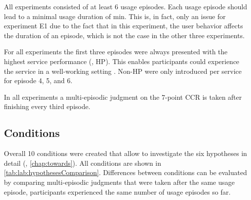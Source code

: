 All experiments consisted of at least 6 usage episodes.
Each usage episode should lead to a minimal usage duration of \unit[2]{min}.
This is, in fact, only an issue for experiment E1 due to the fact that in this experiment, the user behavior affects the duration of an episode, which is not the case in the other three experiments.

For all experiments the first three episodes were always presented with the highest service performance (\ie, \acf{HP}).
This enables participants could experience the service in a well-working setting \citep[\cf,][]{moller_single-call_2011}.
Non-\ac{HP} were only introduced per service for episode 4, 5, and 6.

In all experiments a multi-episodic judgment on the 7-point \ac{CCR} is taken after finishing every third episode.

\subsection{Conditions}
Overall 10 conditions were created that allow to investigate the six hypotheses in detail (\cf, \autoref{chap:towards}).
All conditions are shown in \autoref{tab:lab:hypothesesComparison}.
Differences between conditions can be evaluated by comparing multi-episodic judgments that were taken after the same usage episode, \ie participants experienced the same number of usage episodes so far.


